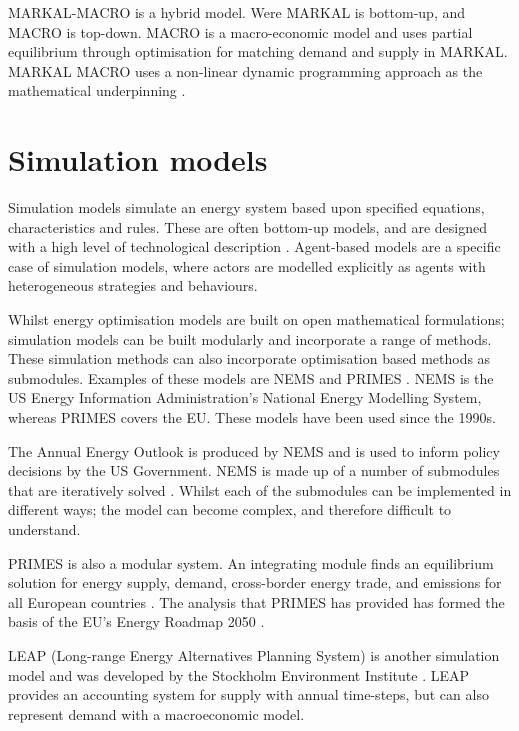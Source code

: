 MARKAL-MACRO is a hybrid model. Were MARKAL is bottom-up, and MACRO is top-down. MACRO is a macro-economic model and uses partial equilibrium through optimisation for matching demand and supply in MARKAL. MARKAL MACRO uses a non-linear dynamic programming approach as the mathematical underpinning \cite{Hall2016a}.


\section{Simulation models}
\label{sec:litreview:simulation}

Simulation models simulate an energy system based upon specified equations, characteristics and rules. These are often bottom-up models, and are designed with a high level of technological description \cite{Ringkjob2018}. Agent-based models are a specific case of simulation models, where actors are modelled explicitly as agents with heterogeneous strategies and behaviours.

Whilst energy optimisation models are built on open mathematical formulations; simulation models can be built modularly and incorporate a range of methods. These simulation methods can also incorporate optimisation based methods as submodules. Examples of these models are NEMS \cite{Gabriel2001} and PRIMES \cite{Gabriel2001}. NEMS is the US Energy Information Administration's National Energy Modelling System, whereas PRIMES covers the EU. These models have been used since the 1990s.

The Annual Energy Outlook is produced by NEMS and is used to inform policy decisions by the US Government. NEMS is made up of a number of submodules that are iteratively solved \cite{Gabriel2001}. Whilst each of the submodules can be implemented in different ways; the model can become complex, and therefore difficult to understand. 

PRIMES is also a modular system. An integrating module finds an equilibrium solution for energy supply, demand, cross-border energy trade, and emissions for all European countries \cite{Capros2012}. The analysis that PRIMES has provided has formed the basis of the EU's Energy Roadmap 2050 \cite{Gupta2011}.

LEAP (Long-range Energy Alternatives Planning System) is another simulation model and was developed by the Stockholm Environment Institute \cite{LEAP2012a}. LEAP provides an accounting system for supply with annual time-steps, but can also represent demand with a macroeconomic model. 

